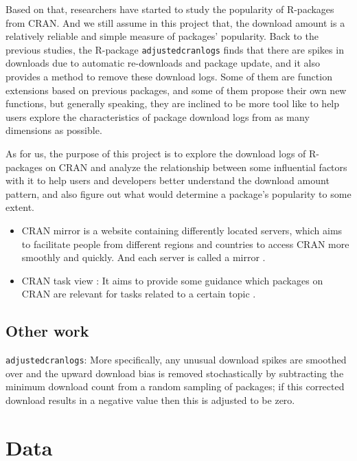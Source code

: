 \documentclass[
]{book}
\begin{document}
Based on that, researchers have started to study the popularity of R-packages from CRAN. And we still assume in this project that, the download amount is a relatively reliable and simple measure of packages' popularity. Back to the previous studies, the R-package \texttt{adjustedcranlogs}\autocite{adjustedcranlogs} finds that there are spikes in downloads due to automatic re-downloads and package update, and it also provides a method to remove these download logs. Some of them are function extensions based on previous packages, and some of them propose their own new functions, but generally speaking, they are inclined to be more tool like to help users explore the characteristics of package download logs from as many dimensions as possible.

As for us, the purpose of this project is to explore the download logs of R-packages on CRAN and analyze the relationship between some influential factors with it to help users and developers better understand the download amount pattern, and also figure out what would determine a package's popularity to some extent.

\begin{itemize}
\item
  CRAN mirror is a website containing differently located servers, which aims to facilitate people from different regions and countries to access CRAN more smoothly and quickly. And each server is called a mirror \autocite{cranmirror}.
\item
  CRAN task view : It aims to provide some guidance which packages on CRAN are relevant for tasks related to a certain topic \autocite{crantaskviews}.
\end{itemize}

\hypertarget{other-work}{%
\section{Other work}\label{other-work}}

\texttt{adjustedcranlogs}: More specifically, any unusual download spikes are smoothed over and the upward download bias is removed stochastically by subtracting the minimum download count from a random sampling of packages; if this corrected download results in a negative value then this is adjusted to be zero.

\hypertarget{data}{%
\chapter{Data}\label{data}}
\end{document}

